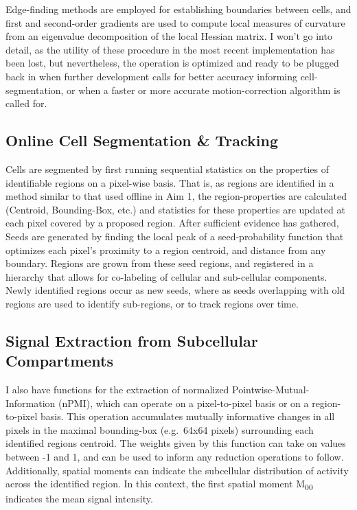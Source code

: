 Edge-finding methods are employed for establishing boundaries between cells, and first and second-order gradients are used to compute local measures of curvature from an eigenvalue decomposition of the local Hessian matrix.
I won't go into detail, as the utility of these procedure in the most recent implementation has been lost, but nevertheless, the operation is optimized and ready to be plugged back in when further development calls for better accuracy informing cell-segmentation, or when a faster or more accurate motion-correction algorithm is called for.

\subsection{Online Cell Segmentation \& Tracking}\label{sec:online-cell-segmentation-tracking}

Cells are segmented by first running sequential statistics on the properties of identifiable regions on a pixel-wise basis.
That is, as regions are identified in a method similar to that used offline in Aim 1, the region-properties are calculated (Centroid, Bounding-Box, etc.) and statistics for these properties are updated at each pixel covered by a proposed region.
After sufficient evidence has gathered, Seeds are generated by finding the local peak of a seed-probability function that optimizes each pixel's proximity to a region centroid, and distance from any boundary.
Regions are grown from these seed regions, and registered in a hierarchy that allows for co-labeling of cellular and sub-cellular components.
Newly identified regions occur as new seeds, where as seeds overlapping with old regions are used to identify sub-regions, or to track regions over time.

\subsection{Signal Extraction from Subcellular Compartments}\label{sec:signal-extraction-from-subcellular-compartments}

I also have functions for the extraction of normalized Pointwise-Mutual-Information (nPMI), which can operate on a pixel-to-pixel basis or on a region-to-pixel basis.
This operation accumulates mutually informative changes in all pixels in the maximal bounding-box (e.g.~64x64 pixels) surrounding each identified regions centroid.
The weights given by this function can take on values between -1 and 1, and can be used to inform any reduction operations to follow.
Additionally, spatial moments can indicate the subcellular distribution of activity across the identified region.
In this context, the first spatial moment M\textsubscript{00} indicates the mean signal intensity.

